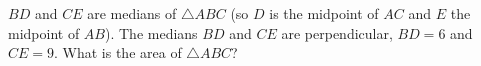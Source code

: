$BD$ and $CE$ are medians of $\triangle ABC$ (so $D$ is the midpoint of $AC$ and $E$ the midpoint of $AB$). The medians $BD$ and $CE$ are perpendicular, $BD=6$ and $CE=9$. What is the area of $\triangle ABC$?
